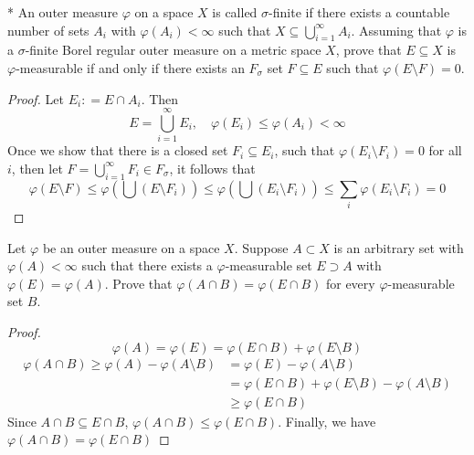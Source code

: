 \documentclass[../main.tex]{subfiles}
\begin{document}
\begin{exercise}*{}{}
      An outer measure \(   \varphi   \) on a space \(  X  \) is called \(   \sigma   \)-finite if there exists a countable number of sets \(  A_{i}  \) with \(   \varphi \left( A_{i} \right)< \infty   \) such that \(  X\subseteq \bigcup _{i= 1}^{\infty}A_{i}  \). Assuming that \(   \varphi   \) is a \(   \sigma   \)-finite Borel regular outer measure on a metric space \(  X  \), prove that \(  E\subseteq X  \) is \(   \varphi   \)-measurable if and only if there exists an \(  F_{ \sigma }   \) set \(  F\subseteq E  \) such that \(   \varphi \left( E\setminus F \right)= 0   \).       
\end{exercise}
\begin{proof}
    Let \(  E_{i}: = E\cap A_{i}  \). Then \[
    E=  \bigcup _{i = 1}^{\infty}E_{i},\quad  \varphi \left( E_{i} \right)\le  \varphi \left( A_{i} \right)< \infty  
    \] Once we show that there is a closed set \(  F_{i}\subseteq E_{i}  \), such that \(   \varphi \left( E_{i}\setminus F_{i} \right)= 0   \) for all \(  i  \), then let \(  F= \bigcup _{i = 1}^{\infty}F_{i}\in F_{ \sigma }  \), it follows that  \[
     \varphi \left( E\setminus F \right)\le  \varphi \left( \bigcup \left( E\setminus F_{i} \right)  \right)\le  \varphi \left( \bigcup \left( E_{i}\setminus F_{i} \right)  \right)\le \sum _{i} \varphi \left( E_{i}\setminus F_{i} \right)= 0    
    \]   
\end{proof}


\begin{exercise}{}{}
Let $\varphi$ be an outer measure on a space $X$. Suppose $A \subset X$ is an arbitrary set with $\varphi(A) < \infty$ such that there exists a $\varphi$-measurable set $E \supset A$ with $\varphi(E) = \varphi(A)$. Prove that $\varphi(A \cap B) = \varphi(E \cap B)$ for every $\varphi$-measurable set $B$.
\end{exercise}
\begin{proof}
   \[
      \varphi \left( A \right)=  \varphi \left( E \right)=  \varphi \left( E\cap B \right)+  \varphi \left( E\setminus B \right)   
     \]  \[
    \begin{aligned}
      \varphi \left( A\cap B \right)\ge  \varphi \left( A \right)- \varphi \left( A\setminus B \right)&=  \varphi \left( E \right)- \varphi \left( A\setminus B \right)  \\ 
       &=  \varphi \left( E\cap B \right)+  \varphi \left( E\setminus B \right)- \varphi \left( A\setminus B \right)\\ 
        &\ge  \varphi \left( E\cap B \right)    
    \end{aligned}    
     \] Since \(  A\cap B\subseteq E\cap B  \), \(   \varphi \left( A\cap B \right)\le  \varphi \left( E\cap B \right)    \). Finally, we have \(   \varphi \left( A\cap B \right)=  \varphi \left( E\cap B \right)    \)   
\end{proof}
\end{document}
